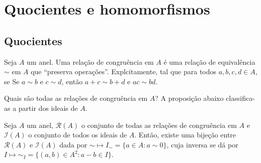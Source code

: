 \chapter{Quocientes e homomorfismos}


\section{Quocientes}
\begin{definition}
    Seja $A$ um anel. Uma relação de congruência em $A$ é uma relação de equivalência $\sim$ em $A$ que ``preserva operações''. Explcitamente, tal que para todos $a, b, c, d \in A$, se Se $a\sim b$ e $c\sim d$, então $a+c\sim b+d$ e $ac\sim bd$.
\end{definition}

Quais são todas as relações de congruência em $A$? A proposição abaixo classifica-as a partir dos ideais de $A$.
\begin{prop}
    Seja $A$ um anel, $\mathcal R(A)$ o conjunto de todas as relações de congruência em $A$ e $\mathcal I(A)$ o conjunto de todos os ideais de $A$. Então, existe uma bijeção entre $\mathcal R(A)$ e $\mathcal I(A)$ dada por
    $\sim \mapsto I_{\sim}=\{a \in A: a\sim 0\}$,
    cuja inversa se dá por $I\mapsto \sim_I=\{(a, b) \in A^2: a-b \in I\}$.
\end{prop}

